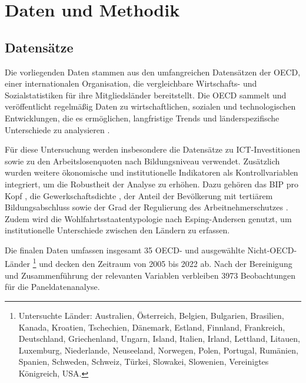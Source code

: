 

\section{Daten und Methodik}

\subsection{Datensätze}

Die vorliegenden Daten stammen aus den umfangreichen Datensätzen der \ac{OECD}, einer 
internationalen Organisation, die vergleichbare Wirtschafts- und Sozialstatistiken für ihre 
Mitgliedsländer bereitstellt. Die \ac{OECD} sammelt und veröffentlicht regelmäßig Daten zu 
wirtschaftlichen, sozialen und technologischen Entwicklungen, die es ermöglichen, langfristige 
Trends und länderspezifische Unterschiede zu analysieren \parencite{oecd2022ict}.

Für diese Untersuchung werden insbesondere die Datensätze zu \ac{ICT}-Investitionen 
\parencite{oecd2022ict} sowie zu den Arbeitslosenquoten nach Bildungsniveau 
\parencite{oecd2022unemployment} verwendet. Zusätzlich wurden weitere ökonomische und 
institutionelle Indikatoren als Kontrollvariablen integriert, um die Robustheit der Analyse 
zu erhöhen. Dazu gehören das \ac{BIP} pro Kopf \parencite{oecd2022gdp}, die Gewerkschaftsdichte 
\parencite{oecd2022tud}, der Anteil der Bevölkerung mit tertiärem Bildungsabschluss 
\parencite{oecd2022education} sowie der Grad der Regulierung des Arbeitnehmerschutzes 
\parencite{oecd2022regulation}. Zudem wird die Wohlfahrtsstaatentypologie nach Esping-Andersen 
\parencite{espingandersen1990thethree} genutzt, um institutionelle Unterschiede zwischen den 
Ländern zu erfassen.

Die finalen Daten umfassen insgesamt 35 OECD- und ausgewählte Nicht-OECD-Länder
\footnote{Untersuchte Länder: Australien, Österreich, Belgien, Bulgarien, Brasilien, 
Kanada, Kroatien, Tschechien, Dänemark, Estland, Finnland, Frankreich, Deutschland, 
Griechenland, Ungarn, Island, Italien, Irland, Lettland, Litauen, Luxemburg, Niederlande, 
Neuseeland, Norwegen, Polen, Portugal, Rumänien, Spanien, Schweden, Schweiz, Türkei, Slowakei, 
Slowenien, Vereinigtes Königreich, USA.} und decken den Zeitraum von 2005 bis 2022 ab. Nach 
der Bereinigung und Zusammenführung der relevanten Variablen verbleiben 3973 Beobachtungen 
für die Paneldatenanalyse.

